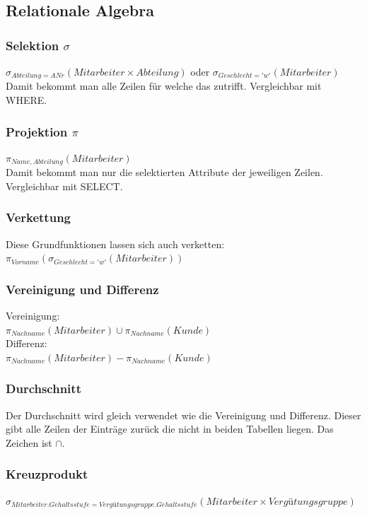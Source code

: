 \documentclass[12pt,a4paper]{article}
\begin{document}
	\subsection{Relationale Algebra}
		\subsubsection{Selektion $\sigma$}
			$\sigma_{Abteilung=ANr}(Mitarbeiter \times Abteilung)$ oder $\sigma_{Geschlecht='w'}(Mitarbeiter)$\\
			Damit bekommt man alle Zeilen für welche das zutrifft. Vergleichbar mit WHERE.
			
		\subsubsection{Projektion $\pi$}
			$\pi_{Name, Abteilung}(Mitarbeiter)$\\
			Damit bekommt man nur die selektierten Attribute der jeweiligen Zeilen. Vergleichbar mit SELECT.

		\subsubsection{Verkettung}
			Diese Grundfunktionen lassen sich auch verketten:\\
			$\pi_{Vorname}(\sigma_{Geschlecht='w'}(Mitarbeiter))$

		\subsubsection{Vereinigung und Differenz}
			Vereinigung:\\
			$\pi_{Nachname}(Mitarbeiter) \cup \pi_{Nachname}(Kunde)$\\
			Differenz:\\
			$\pi_{Nachname}(Mitarbeiter) - \pi_{Nachname}(Kunde)$

		\subsubsection{Durchschnitt}
			Der Durchschnitt wird gleich verwendet wie die Vereinigung und Differenz. Dieser gibt alle Zeilen der Einträge zurück die nicht in beiden Tabellen liegen. Das Zeichen ist $\cap$.

		\subsubsection{Kreuzprodukt}
			$\sigma_{Mitarbeiter.Gehaltsstufe = Vergütungsgruppe.Gehaltsstufe}(Mitarbeiter \times Vergütungsgruppe)$
			
\end{document}
